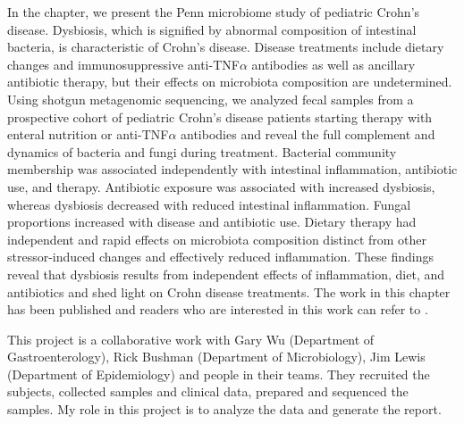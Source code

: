  \label{chpt2:please}

In the chapter, we present the Penn microbiome study of pediatric Crohn's disease. Dysbiosis, which is signified by abnormal composition of intestinal bacteria, is characteristic of Crohn's disease. Disease treatments include dietary changes and immunosuppressive anti-TNF$\alpha$ antibodies as well as ancillary antibiotic therapy, but their effects on microbiota composition are undetermined. Using shotgun metagenomic sequencing, we analyzed fecal samples from a prospective cohort of pediatric Crohn's disease patients starting therapy with enteral nutrition or anti-TNF$\alpha$ antibodies and reveal the full complement and dynamics of bacteria and fungi during treatment. Bacterial community membership was associated independently with intestinal inflammation, antibiotic use, and therapy. Antibiotic exposure was associated with increased dysbiosis, whereas dysbiosis decreased with reduced intestinal inflammation. Fungal proportions increased with disease and antibiotic use. Dietary therapy had independent and rapid effects on microbiota composition distinct from other stressor-induced changes and effectively reduced inflammation. These findings reveal that dysbiosis results from independent effects of inflammation, diet, and antibiotics and shed light on Crohn disease treatments. The work in this chapter has been published and readers who are interested in this work can refer to \citet{lewis2015inflammation, lee2015comparative}.


This project is a collaborative work with Gary Wu (Department of Gastroenterology), Rick Bushman (Department of Microbiology), Jim Lewis (Department of Epidemiology) and people in their teams. They recruited the subjects, collected samples and clinical data, prepared and sequenced the samples. My role in this project is to analyze the data and generate the report.

